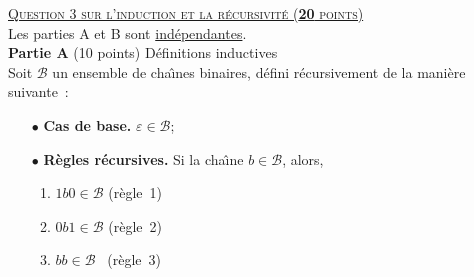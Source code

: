 
\newcommand{\Pgcd}{{\rm Pgcd}}

{\textsc{\underline{Question 3 sur l'induction et la récursivité (\textbf{20} points)}}}\\


Les parties A et B sont \underline{indépendantes}.\\

\textbf{Partie A} (10 points) D\'efinitions inductives\\
    
Soit $\mathcal{B}$ un ensemble de cha{\^\i}nes binaires, défini récursivement de la mani\`ere suivante~:
\begin{enumerate}
    \item[$\bullet$] \textbf{Cas de base.} $\varepsilon \in \mathcal{B}$;  %

    \item[$\bullet$] \textbf{R\`egles r\'ecursives.} Si la cha{\^\i}ne  $b \in \mathcal{B}$, alors,
    
    \begin{enumerate}[R1.]
     \item   $1b0 \in \mathcal{B} $  \quad\mbox{(r\`egle 1)}
     \item   $0b1 \in \mathcal{B}$  \quad\mbox{(r\`egle 2)} 
     \item  $bb \in \mathcal{B}$  \quad\mbox{     (r\`egle 3)}
    \end{enumerate}

\end{enumerate} 
